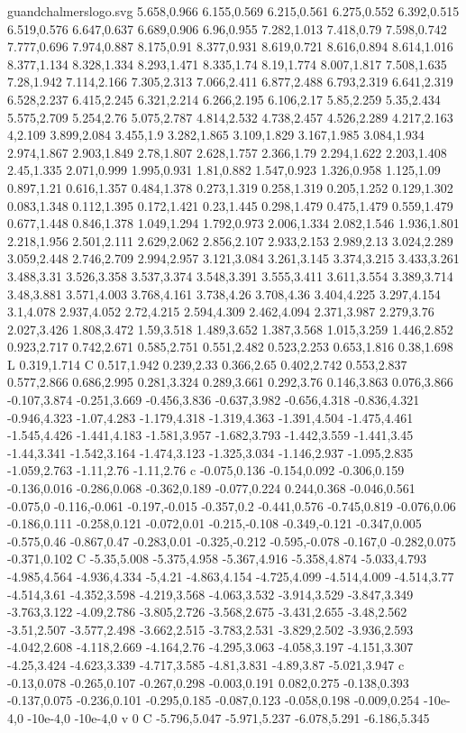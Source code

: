 \begin{filecontents}[noheader]{guandchalmerslogo.svg}
5.658,0.966 6.155,0.569 6.215,0.561 6.275,0.552 6.392,0.515 6.519,0.576 6.647,0.637 6.689,0.906 6.96,0.955 7.282,1.013 7.418,0.79 7.598,0.742 7.777,0.696 7.974,0.887 8.175,0.91 8.377,0.931 8.619,0.721 8.616,0.894 8.614,1.016 8.377,1.134 8.328,1.334 8.293,1.471 8.335,1.74 8.19,1.774 8.007,1.817 7.508,1.635 7.28,1.942 7.114,2.166 7.305,2.313 7.066,2.411 6.877,2.488 6.793,2.319 6.641,2.319 6.528,2.237 6.415,2.245 6.321,2.214 6.266,2.195 6.106,2.17 5.85,2.259 5.35,2.434 5.575,2.709 5.254,2.76 5.075,2.787 4.814,2.532 4.738,2.457 4.526,2.289 4.217,2.163 4,2.109 3.899,2.084 3.455,1.9 3.282,1.865 3.109,1.829 3.167,1.985 3.084,1.934 2.974,1.867 2.903,1.849 2.78,1.807 2.628,1.757 2.366,1.79 2.294,1.622 2.203,1.408 2.45,1.335 2.071,0.999 1.995,0.931 1.81,0.882 1.547,0.923 1.326,0.958 1.125,1.09 0.897,1.21 0.616,1.357 0.484,1.378 0.273,1.319 0.258,1.319 0.205,1.252 0.129,1.302 0.083,1.348 0.112,1.395 0.172,1.421 0.23,1.445 0.298,1.479 0.475,1.479 0.559,1.479 0.677,1.448 0.846,1.378 1.049,1.294 1.792,0.973 2.006,1.334 2.082,1.546 1.936,1.801 2.218,1.956 2.501,2.111 2.629,2.062 2.856,2.107 2.933,2.153 2.989,2.13 3.024,2.289 3.059,2.448 2.746,2.709 2.994,2.957 3.121,3.084 3.261,3.145 3.374,3.215 3.433,3.261 3.488,3.31 3.526,3.358 3.537,3.374 3.548,3.391 3.555,3.411 3.611,3.554 3.389,3.714 3.48,3.881 3.571,4.003 3.768,4.161 3.738,4.26 3.708,4.36 3.404,4.225 3.297,4.154 3.1,4.078 2.937,4.052 2.72,4.215 2.594,4.309 2.462,4.094 2.371,3.987 2.279,3.76 2.027,3.426 1.808,3.472 1.59,3.518 1.489,3.652 1.387,3.568 1.015,3.259 1.446,2.852 0.923,2.717 0.742,2.671 0.585,2.751 0.551,2.482 0.523,2.253 0.653,1.816 0.38,1.698 L 0.319,1.714 C 0.517,1.942 0.239,2.33 0.366,2.65 0.402,2.742 0.553,2.837 0.577,2.866 0.686,2.995 0.281,3.324 0.289,3.661 0.292,3.76 0.146,3.863 0.076,3.866 -0.107,3.874 -0.251,3.669 -0.456,3.836 -0.637,3.982 -0.656,4.318 -0.836,4.321 -0.946,4.323 -1.07,4.283 -1.179,4.318 -1.319,4.363 -1.391,4.504 -1.475,4.461 -1.545,4.426 -1.441,4.183 -1.581,3.957 -1.682,3.793 -1.442,3.559 -1.441,3.45 -1.44,3.341 -1.542,3.164 -1.474,3.123 -1.325,3.034 -1.146,2.937 -1.095,2.835 -1.059,2.763 -1.11,2.76 -1.11,2.76 c -0.075,0.136 -0.154,0.092 -0.306,0.159 -0.136,0.016 -0.286,0.068 -0.362,0.189 -0.077,0.224 0.244,0.368 -0.046,0.561 -0.075,0 -0.116,-0.061 -0.197,-0.015 -0.357,0.2 -0.441,0.576 -0.745,0.819 -0.076,0.06 -0.186,0.111 -0.258,0.121 -0.072,0.01 -0.215,-0.108 -0.349,-0.121 -0.347,0.005 -0.575,0.46 -0.867,0.47 -0.283,0.01 -0.325,-0.212 -0.595,-0.078 -0.167,0 -0.282,0.075 -0.371,0.102 C -5.35,5.008 -5.375,4.958 -5.367,4.916 -5.358,4.874 -5.033,4.793 -4.985,4.564 -4.936,4.334 -5,4.21 -4.863,4.154 -4.725,4.099 -4.514,4.009 -4.514,3.77 -4.514,3.61 -4.352,3.598 -4.219,3.568 -4.063,3.532 -3.914,3.529 -3.847,3.349 -3.763,3.122 -4.09,2.786 -3.805,2.726 -3.568,2.675 -3.431,2.655 -3.48,2.562 -3.51,2.507 -3.577,2.498 -3.662,2.515 -3.783,2.531 -3.829,2.502 -3.936,2.593 -4.042,2.608 -4.118,2.669 -4.164,2.76 -4.295,3.063 -4.058,3.197 -4.151,3.307 -4.25,3.424 -4.623,3.339 -4.717,3.585 -4.81,3.831 -4.89,3.87 -5.021,3.947 c -0.13,0.078 -0.265,0.107 -0.267,0.298 -0.003,0.191 0.082,0.275 -0.138,0.393 -0.137,0.075 -0.236,0.101 -0.295,0.185 -0.087,0.123 -0.058,0.198 -0.009,0.254 -10e-4,0 -10e-4,0 -10e-4,0 v 0 C -5.796,5.047 -5.971,5.237 -6.078,5.291 -6.186,5.345 
\end{filecontents}
